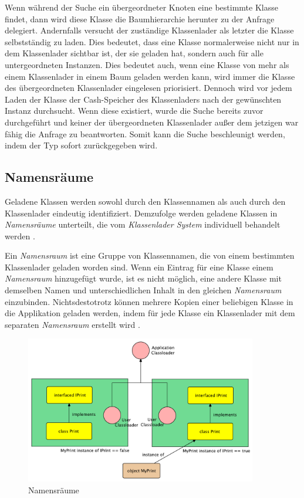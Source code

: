     Wenn während der Suche ein übergeordneter Knoten eine bestimmte Klasse findet, dann wird diese Klasse die Baumhierarchie herunter zu der Anfrage delegiert. Andernfalls versucht der zuständige Klassenlader als letzter die Klasse selbstständig zu laden. Dies bedeutet, dass eine Klasse normalerweise nicht nur in dem Klassenlader sichtbar ist, der sie geladen hat, sondern auch für alle untergeordneten Instanzen. Dies bedeutet auch, wenn eine Klasse von mehr als einem Klassenlader in einem Baum geladen werden kann, wird immer die Klasse des übergeordneten Klassenlader eingelesen priorisiert. Dennoch wird vor jedem Laden der Klasse der Cash-Speicher des Klassenladers nach der gewünschten Instanz durchsucht. Wenn diese existiert, wurde die Suche bereits zuvor durchgeführt und keiner der übergeordneten Klassenlader außer dem jetzigen war fähig die Anfrage zu beantworten. Somit kann die Suche beschleunigt werden, indem der Typ sofort zurückgegeben wird. \cite{parentDelegationModel}


  \subsection{Namensräume} \label{sec:nam}

    Geladene Klassen werden sowohl durch den Klassennamen als auch durch den Klassenlader eindeutig identifiziert. Demzufolge werden geladene Klassen in \textit{Namensräume} unterteilt, die vom \textit{Klassenlader System} individuell behandelt werden \cite{namespaces}. 

    Ein \textit{Namensraum} ist eine Gruppe von Klassennamen, die von einem bestimmten Klassenlader geladen worden sind. Wenn ein Eintrag für eine Klasse einem \textit{Namensraum} hinzugefügt wurde, ist es nicht möglich, eine andere Klasse mit demselben Namen und unterschiedlichen Inhalt in den gleichen \textit{Namensraum} einzubinden. Nichtsdestotrotz können mehrere Kopien einer beliebigen Klasse in die Applikation geladen werden, indem für jede Klasse ein Klassenlader mit dem separaten \textit{Namensraum} erstellt wird \cite{customClDiffSpace}. 

    \begin{figure}[h]
      \centering
      \includegraphics[width=0.9\textwidth]{material/images/namespace.pdf}
      \caption{Namensräume \cite{customClDiffSpace}}
      \label{fig:nam}
    \end{figure}

